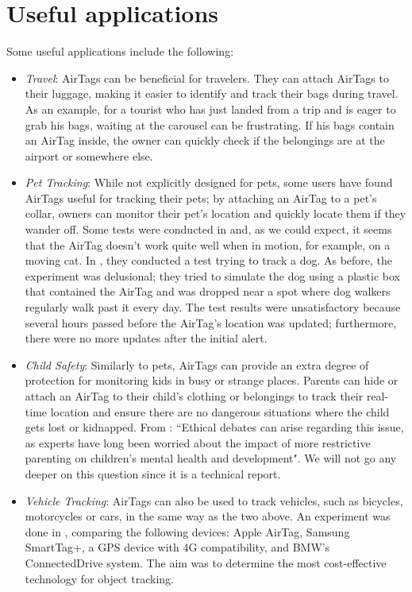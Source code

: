 \documentclass[english]{article}
\begin{document}
\section{Useful applications}\label{appl}
Some useful applications include the following:
\begin{itemize}
  \item \textit{Travel}: AirTags can be beneficial for travelers. They can attach AirTags to their luggage, making it easier to identify and track their bags during travel. As an example, for a tourist who has just landed from a trip and is eager to grab his bags, waiting at the carousel can be frustrating. If his bags contain an AirTag inside, the owner can quickly check if the belongings are at the airport or somewhere else. 
  \item \textit{Pet Tracking}: While not explicitly designed for pets, some users have found AirTags useful for tracking their pets; by attaching an AirTag to a pet's collar, owners can monitor their pet's location and quickly locate them if they wander off. Some tests were conducted in \cite{KittyCatGO2024} and, as we could expect, it seems that the AirTag doesn’t work quite well when in motion, for example, on a moving cat. In \cite{Src2024}, they conducted a test trying to track a dog. As before, the experiment was delusional; they tried to simulate the dog using a plastic box that contained the AirTag and was dropped near a spot where dog walkers regularly walk past it every day. 
  The test results were unsatisfactory because several hours passed before the AirTag's location was updated; furthermore, there were no more updates after the initial alert.
  \item \textit{Child Safety}: Similarly to pets, AirTags can provide an extra degree of protection for monitoring kids in busy or strange places. Parents can hide or attach an AirTag to their child's clothing or belongings to track their real-time location and ensure there are no dangerous situations where the child gets lost or kidnapped. From \cite{Kelly_2023}: ``Ethical debates can arise regarding this issue, as experts have long been worried about the impact of more restrictive parenting on children’s mental health and development". We will not go any deeper on this question since it is a technical report.
  \item \textit{Vehicle Tracking}: AirTags can also be used to track vehicles, such as bicycles, motorcycles or cars, in the same way as the two above. An experiment was done in \cite{Maric2023}, comparing the following devices: Apple AirTag, Samsung SmartTag+, a GPS device with 4G compatibility, and BMW's ConnectedDrive system. The aim was to determine the most cost-effective technology for object tracking.

\end{itemize}
\end{document}

